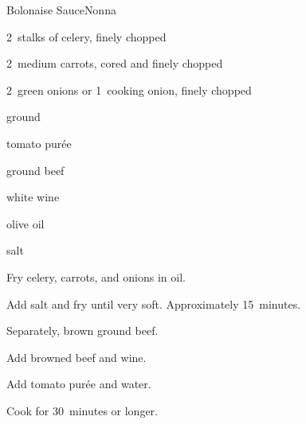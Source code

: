 \begin{recipe}{Bolonaise Sauce}{Nonna}{}

\begin{ingredients}
\item 2~stalks of celery, finely chopped
\item 2~medium carrots, cored and finely chopped
\item 2~green onions or 1~cooking onion, finely chopped
\item \lbs{\half} ground 
\item tomato pur\'ee
\item \lbs{\half} ground beef
\item \C{\half} white wine
\item olive oil
\item salt
\end{ingredients}

\begin{directions}
\item Fry celery, carrots, and onions in oil.
\item Add salt and fry until very soft. Approximately 15~minutes.
\item Separately, brown ground beef.
\item Add browned beef and wine.
\item Add tomato pur\'ee and water.
\item Cook for 30~minutes or longer.
\end{directions}

\end{recipe}
